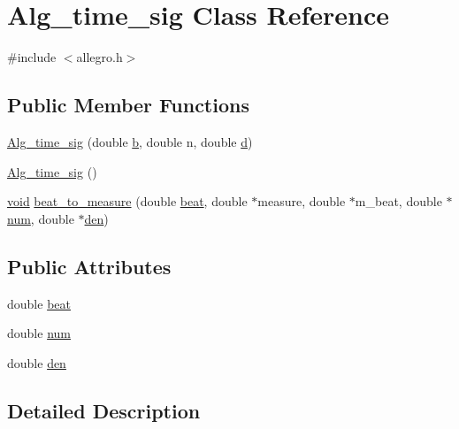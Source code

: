 \hypertarget{class_alg__time__sig}{}\section{Alg\+\_\+time\+\_\+sig Class Reference}
\label{class_alg__time__sig}


{\ttfamily \#include $<$allegro.\+h$>$}

\subsection*{Public Member Functions}
\begin{DoxyCompactItemize}
\item 
\hyperlink{class_alg__time__sig_a40002a4b89ff77625b209bf85725101d}{Alg\+\_\+time\+\_\+sig} (double \hyperlink{convtest_8m_a21ad0bd836b90d08f4cf640b4c298e7c}{b}, double n, double \hyperlink{poly-fir_8h_a2530554172d8629149ec56816eeaa947}{d})
\item 
\hyperlink{class_alg__time__sig_a746bb92a5e6167b83e10c1529b03b0f5}{Alg\+\_\+time\+\_\+sig} ()
\item 
\hyperlink{sound_8c_ae35f5844602719cf66324f4de2a658b3}{void} \hyperlink{class_alg__time__sig_ad40080cc632061b8d2da7488bba37280}{beat\+\_\+to\+\_\+measure} (double \hyperlink{class_alg__time__sig_a6934cb96babb7728fb421236186d7fc1}{beat}, double $\ast$measure, double $\ast$m\+\_\+beat, double $\ast$\hyperlink{class_alg__time__sig_a79476aacf5e3138f24ee80f56d6fc580}{num}, double $\ast$\hyperlink{class_alg__time__sig_aff9848a9e6b557a01048ca0cffb9edef}{den})
\end{DoxyCompactItemize}
\subsection*{Public Attributes}
\begin{DoxyCompactItemize}
\item 
double \hyperlink{class_alg__time__sig_a6934cb96babb7728fb421236186d7fc1}{beat}
\item 
double \hyperlink{class_alg__time__sig_a79476aacf5e3138f24ee80f56d6fc580}{num}
\item 
double \hyperlink{class_alg__time__sig_aff9848a9e6b557a01048ca0cffb9edef}{den}
\end{DoxyCompactItemize}


\subsection{Detailed Description}


